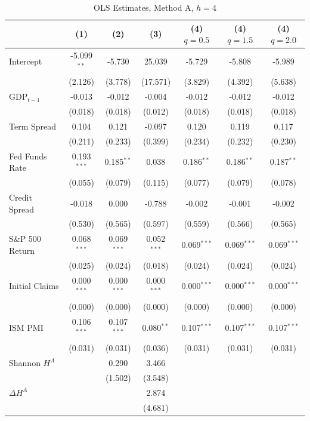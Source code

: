 \begin{table}[htbp]
\centering
\caption{OLS Estimates, Method A, $h = 4$}
\label{tab:ols_coef_A_h4}
\footnotesize
\begin{tabular}{lcccccc}
\toprule
 & (1) & (2) & (3) & (4) $q\!=\!0.5$ & (4) $q\!=\!1.5$ & (4) $q\!=\!2.0$ \\
\midrule
  Intercept & -5.099$^{**}$ & -5.730 & 25.039 & -5.729 & -5.808 & -5.989 \\
  & (2.126) & (3.778) & (17.571) & (3.829) & (4.392) & (5.638) \\[2pt]
  GDP$_{t-1}$ & -0.013 & -0.012 & -0.004 & -0.012 & -0.012 & -0.012 \\
  & (0.018) & (0.018) & (0.012) & (0.018) & (0.018) & (0.018) \\[2pt]
  Term Spread & 0.104 & 0.121 & -0.097 & 0.120 & 0.119 & 0.117 \\
  & (0.211) & (0.233) & (0.399) & (0.234) & (0.232) & (0.230) \\[2pt]
  Fed Funds Rate & 0.193$^{***}$ & 0.185$^{**}$ & 0.038 & 0.186$^{**}$ & 0.186$^{**}$ & 0.187$^{**}$ \\
  & (0.055) & (0.079) & (0.115) & (0.077) & (0.079) & (0.078) \\[2pt]
  Credit Spread & -0.018 & 0.000 & -0.788 & -0.002 & -0.001 & -0.002 \\
  & (0.530) & (0.565) & (0.597) & (0.559) & (0.566) & (0.565) \\[2pt]
  S\&P 500 Return & 0.068$^{***}$ & 0.069$^{***}$ & 0.052$^{***}$ & 0.069$^{***}$ & 0.069$^{***}$ & 0.069$^{***}$ \\
  & (0.025) & (0.024) & (0.018) & (0.024) & (0.024) & (0.024) \\[2pt]
  Initial Claims & 0.000$^{***}$ & 0.000$^{***}$ & 0.000$^{***}$ & 0.000$^{***}$ & 0.000$^{***}$ & 0.000$^{***}$ \\
  & (0.000) & (0.000) & (0.000) & (0.000) & (0.000) & (0.000) \\[2pt]
  ISM PMI & 0.106$^{***}$ & 0.107$^{***}$ & 0.080$^{**}$ & 0.107$^{***}$ & 0.107$^{***}$ & 0.107$^{***}$ \\
  & (0.031) & (0.031) & (0.036) & (0.031) & (0.031) & (0.031) \\[2pt]
  Shannon $H^A$ &  & 0.290 & 3.466 &  &  &  \\
  &  & (1.502) & (3.548) &  &  &  \\[2pt]
  $\Delta H^A$ &  &  & 2.874 &  &  &  \\
  &  &  & (4.681) &  &  &  \\[2pt]

\end{tabular}
\end{table}
